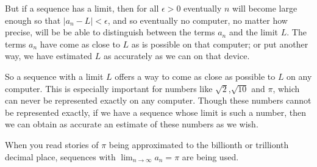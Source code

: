 But if a sequence has a limit, then for all $\epsilon > 0$ eventually $n$ will become large enough so that $|a_n -L|<\epsilon$, and so eventually no computer, no matter how precise, will be be able to distinguish between the terms $a_n$ and the limit $L$. The terms $a_n$ have come as close to $L$ as is possible on that computer; or put another way, we have estimated $L$ as accurately as we can on that device.

So a sequence with a limit $L$ offers a way to come as close as possible to $L$ on any computer. This is especially important for numbers like $\sqrt{2}$,$\sqrt{10}$ and $\pi$, which can never be represented exactly on any computer. Though these numbers cannot be represented exactly, if we have a sequence whose limit is such a number, then we can obtain as accurate an estimate of these numbers as we wish.

When you read stories of $\pi$ being approximated to the billionth or trillionth decimal place, sequences with $\lim_{n \to \infty} a_n = \pi$ are being used.



